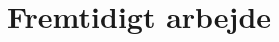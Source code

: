 \documentclass[Rapport/Rapport_main.tex]{subfiles}
\begin{document}
\section{Fremtidigt arbejde}
\end{document}

